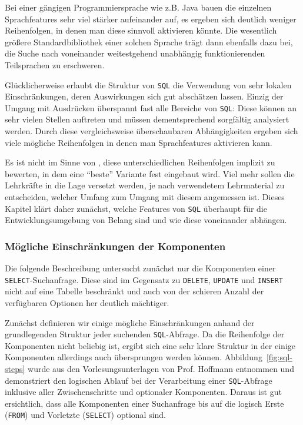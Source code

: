 Bei einer gängigen Programmiersprache wie z.B. Java bauen die einzelnen Sprachfeatures sehr viel stärker aufeinander auf, es ergeben sich deutlich weniger Reihenfolgen, in denen man diese sinnvoll aktivieren könnte. Die wesentlich größere Standardbibliothek einer solchen Sprache trägt dann ebenfalls dazu bei, die Suche nach voneinander weitestgehend unabhängig funktionierenden Teilsprachen zu erschweren.

Glücklicherweise erlaubt die Struktur von \texttt{SQL} die Verwendung von sehr lokalen Einschränkungen, deren Auswirkungen sich gut abschätzen lassen. Einzig der Umgang mit Ausdrücken überspannt fast alle Bereiche von \texttt{SQL}: Diese können an sehr vielen Stellen auftreten und müssen dementsprechend sorgfältig analysiert werden. Durch diese vergleichsweise überschaubaren Abhängigkeiten ergeben sich viele mögliche Reihenfolgen in denen man Sprachfeatures aktivieren kann. 

Es ist nicht im Sinne von \idename{}, diese unterschiedlichen Reihenfolgen implizit zu bewerten, in dem eine "`beste"' Variante fest eingebaut wird. Viel mehr sollen die Lehrkräfte in die Lage versetzt werden, je nach verwendetem Lehrmaterial zu entscheiden, welcher Umfang zum Umgang mit diesem angemessen ist. Dieses Kapitel klärt daher zunächst, welche Features von \texttt{SQL} überhaupt für die Entwicklungsumgebung von Belang sind und wie diese voneinander abhängen.

\subsubsection{Mögliche Einschränkungen der Komponenten}
\label{sec:sql-subset-local}

Die folgende Beschreibung untersucht zunächst nur die Komponenten einer \texttt{SELECT}-Suchanfrage. Diese sind im Gegensatz zu \texttt{DELETE}, \texttt{UPDATE} und \texttt{INSERT} nicht auf eine Tabelle beschränkt und auch von der schieren Anzahl der verfügbaren Optionen her deutlich mächtiger.

Zunächst definieren wir einige mögliche Einschränkungen anhand der grundlegenden Struktur jeder suchenden \texttt{SQL}-Abfrage. Da die Reihenfolge der Komponenten nicht beliebig ist, ergibt sich eine sehr klare Struktur in der einige Komponenten allerdings auch übersprungen werden können. Abbildung~\ref{fig:sql-steps} wurde aus den Vorlesungsunterlagen von Prof. Hoffmann entnommen und demonstriert den logischen Ablauf bei der Verarbeitung einer \texttt{SQL}-Abfrage inklusive aller Zwischenschritte und optionaler Komponenten. Daraus ist gut ersichtlich, dass alle Komponenten einer Suchanfrage bis auf die logisch Erste (\texttt{FROM}) und Vorletzte (\texttt{SELECT}) optional sind.


